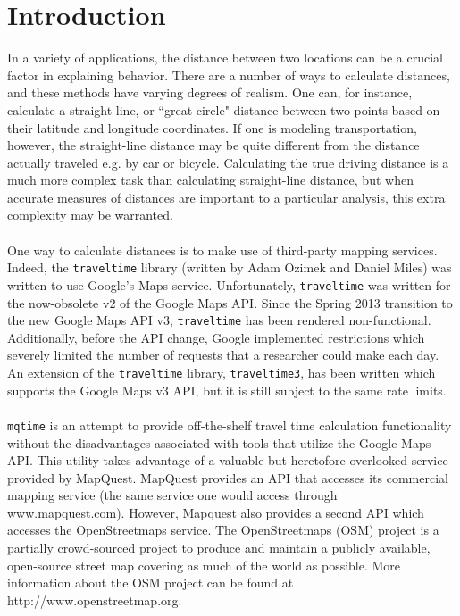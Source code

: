\documentclass[11pt]{article}
\begin{document}
\section{Introduction}
In a variety of applications, the distance between two locations can be a crucial factor in explaining behavior. There are a number of ways to calculate distances, and these methods have varying degrees of realism. One can, for instance, calculate a straight-line, or ``great circle" distance between two points based on their latitude and longitude coordinates. If one is modeling transportation, however, the straight-line distance may be quite different from the distance actually traveled e.g. by car or bicycle. Calculating the true driving distance is a much more complex task than calculating straight-line distance, but when accurate measures of distances are important to a particular analysis, this extra complexity may be warranted.
\\ \\
One way to calculate distances is to make use of third-party mapping services. Indeed, the \verb|traveltime| library (written by Adam Ozimek and Daniel Miles) was written to use Google's Maps service. Unfortunately, \verb|traveltime| was written for the now-obsolete v2 of the Google Maps API. Since the Spring 2013 transition to the new Google Maps API v3, \verb|traveltime| has been rendered non-functional. Additionally, before the API change, Google implemented restrictions which severely limited the number of requests that a researcher could make each day. An extension of the \verb|traveltime| library, \verb|traveltime3|, has been written which supports the Google Maps v3 API, but it is still subject to the same rate limits. 
\\ \\
\verb|mqtime| is an attempt to provide off-the-shelf travel time calculation functionality without the disadvantages associated with tools that utilize the Google Maps API. This utility takes advantage of a valuable but heretofore overlooked service provided by MapQuest. MapQuest provides an API that accesses its commercial mapping service (the same service one would access through www.mapquest.com). However, Mapquest also provides a second API which accesses the OpenStreetmaps service. The OpenStreetmaps (OSM) project is a partially crowd-sourced project to produce and maintain a publicly available, open-source street map covering as much of the world as possible. More information about the OSM project can be found at http://www.openstreetmap.org. 
\\ \\
\end{document}

